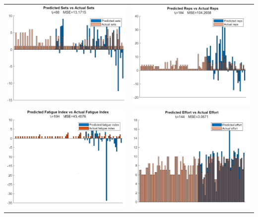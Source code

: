 \begin{table}
    \centering
    \begin{tabular}{c|c}
        \includegraphics[width=80mm]{ActualVsPredValues/ActualVsPredSets.png} &
        \includegraphics[width=80mm]{ActualVsPredValues/ActualVsPredReps.png}  \\
        
        \includegraphics[width=80mm]{ActualVsPredValues/ActualVsPredFatigueIndex.png} &
        \includegraphics[width=80mm]{ActualVsPredValues/ActualVsPredEffort.png} \\
        

\end{tabular}
\end{table}
